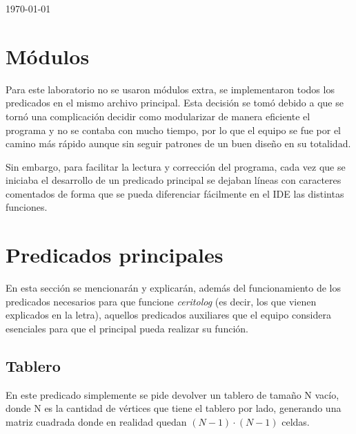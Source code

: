 \documentclass[12pt]{article} %
\begin{document}
\begin{titlepage}
		{\large \today}\\[1cm] %
		
		\vfill %
		
	\end{titlepage}
	
	\section{Módulos}
	Para este laboratorio no se usaron módulos extra, se implementaron todos los predicados en el mismo archivo principal. Esta decisión se tomó debido a que se tornó una complicación decidir como modularizar de manera eficiente el programa y no se contaba con mucho tiempo, por lo que el equipo se fue por el camino más rápido aunque sin seguir patrones de un buen diseño en su totalidad.
	
	Sin embargo, para facilitar la lectura y corrección del programa, cada vez que se iniciaba el desarrollo de un predicado principal se dejaban líneas con caracteres comentados de forma que se pueda diferenciar fácilmente en el IDE las distintas funciones.
	
	\section{Predicados principales}
	En esta sección se mencionarán y explicarán, además del funcionamiento de los predicados necesarios para que funcione \textit{ceritolog} (es decir, los que vienen explicados en la letra), aquellos predicados auxiliares que el equipo considera esenciales para que el principal pueda realizar su función.
	
		\subsection{Tablero}
		En este predicado simplemente se pide devolver un tablero de tamaño N vacío, donde N es la cantidad de vértices que tiene el tablero por lado, generando una matriz cuadrada donde en realidad quedan $(N-1)\cdot(N-1)$ celdas. \\
		
\end{document}
